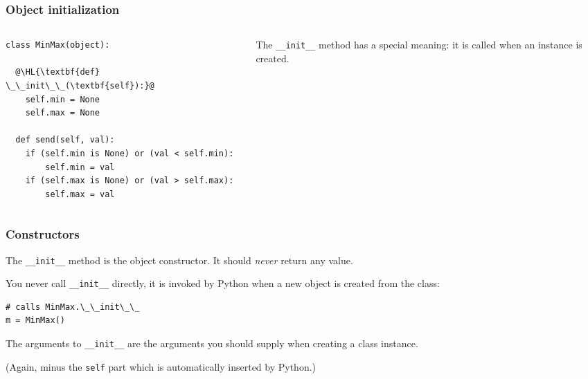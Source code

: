 \documentclass[english,serif,mathserif,xcolor=pdftex,dvipsnames,table]{beamer}
\begin{document}
\begin{frame}[fragile]
  \frametitle{Object initialization}
  \begin{columns}[t]
    \begin{column}{0.5\textwidth}
\begin{lstlisting}
class MinMax(object):

  @\HL{\textbf{def} \_\_init\_\_(\textbf{self}):}@
    self.min = None
    self.max = None

  def send(self, val):
    if (self.min is None) or (val < self.min):
        self.min = val
    if (self.max is None) or (val > self.max):
        self.max = val
\end{lstlisting}
    \end{column}
    \begin{column}{0.5\textwidth}
      \raggedleft
      The \lstinline|__init__| method has a special
      meaning: it is called when an instance is created.
    \end{column}
  \end{columns}
\end{frame}



\begin{frame}[fragile]
  \frametitle{Constructors}

  The \lstinline|__init__| method is the object constructor.
  It should \emph{never} return any value.

  \+ 
  You never call \lstinline|__init__| directly, it is invoked by
  Python when a new object is created from the class:
\begin{lstlisting}
# calls MinMax.\_\_init\_\_
m = MinMax()
\end{lstlisting}

  \+ 
  The arguments to \lstinline|__init__| are the arguments you
  should supply when creating a class instance.

  \+ 
  (Again, minus the \texttt{self} part which is automatically
  inserted by Python.)
\end{frame}






\end{document}
